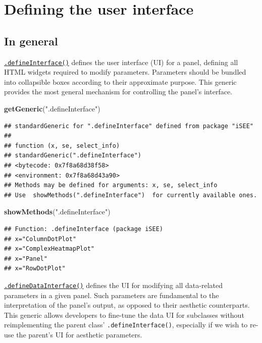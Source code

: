 \documentclass[
]{book}
\newenvironment{Shaded}{\begin{snugshade}}{\end{snugshade}}
\newcommand{\KeywordTok}[1]{\textcolor[rgb]{0.13,0.29,0.53}{\textbf{#1}}}
\newcommand{\NormalTok}[1]{#1}
\newcommand{\StringTok}[1]{\textcolor[rgb]{0.31,0.60,0.02}{#1}}
\begin{document}
\hypertarget{defining-the-user-interface}{%
\section{Defining the user interface}\label{defining-the-user-interface}}

\hypertarget{in-general}{%
\subsection{In general}\label{in-general}}

\href{https://isee.github.io/iSEE/reference/interface-generics.html}{\texttt{.defineInterface()}} defines the user interface (UI) for a panel, defining all HTML widgets required to modify parameters.
Parameters should be bundled into collapsible boxes according to their approximate purpose.
This generic provides the most general mechanism for controlling the panel's interface.

\begin{Shaded}
\begin{Highlighting}[]
\KeywordTok{getGeneric}\NormalTok{(}\StringTok{".defineInterface"}\NormalTok{)}
\end{Highlighting}
\end{Shaded}

\begin{verbatim}
## standardGeneric for ".defineInterface" defined from package "iSEE"
## 
## function (x, se, select_info) 
## standardGeneric(".defineInterface")
## <bytecode: 0x7f8a68d38f58>
## <environment: 0x7f8a68d43a90>
## Methods may be defined for arguments: x, se, select_info
## Use  showMethods(".defineInterface")  for currently available ones.
\end{verbatim}

\begin{Shaded}
\begin{Highlighting}[]
\KeywordTok{showMethods}\NormalTok{(}\StringTok{".defineInterface"}\NormalTok{)}
\end{Highlighting}
\end{Shaded}

\begin{verbatim}
## Function: .defineInterface (package iSEE)
## x="ColumnDotPlot"
## x="ComplexHeatmapPlot"
## x="Panel"
## x="RowDotPlot"
\end{verbatim}

\href{https://isee.github.io/iSEE/reference/interface-generics.html}{\texttt{.defineDataInterface()}} defines the UI for modifying all data-related parameters in a given panel.
Such parameters are fundamental to the interpretation of the panel's output, as opposed to their aesthetic counterparts.
This generic allows developers to fine-tune the data UI for subclasses without reimplementing the parent class' \texttt{.defineInterface()}, especially if we wish to re-use the parent's UI for aesthetic parameters.
\end{document}
